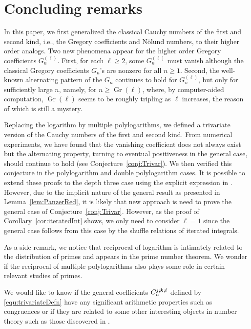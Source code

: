 \documentclass[11pt]{article}
\newcommand{\bfk}{{\boldsymbol{\sl{k}}}}
\DeclareMathOperator{\Gr}{Gr}
\theoremstyle{plain}
\theoremstyle{definition}
\begin{document}
\section{Concluding remarks}
In this paper, we first generalized the classical Cauchy numbers of the first and second kind, i.e., the Gregory coefficients and N\"olund numbers, to their higher order analogs. Two new phenomena appear for the higher order Gregory coefficients $G_n^{(\ell)}$. First, for each $\ell\ge 2$, some $G_n^{(\ell)}$ must vanish although the classical Gregory coefficients $G_n$'s are nonzero for all $n\ge1$. Second, the well-known alternating pattern of the $G_n$ continues to hold for $G_n^{(\ell)}$, but only for sufficiently large $n$, namely, for $n\ge \Gr(\ell)$, where, by computer-aided computation, $\Gr(\ell)$ seems to be roughly tripling as $\ell$ increases, the reason of which is still a mystery.

Replacing the logarithm by multiple polylogarithms, we defined a trivariate version of the Cauchy numbers of the first and second kind. From numerical experiments, we have found that the vanishing coefficient does not always exist but the alternating property, turning to eventual positiveness in the general case, should continue to hold (see Conjecture~\ref{conj:Trivar}). We then verified this conjecture in the polylogarithm and double polylogarithm cases. It is possible to extend these proofs to the depth three case using the explicit expression in \cite[(4.3)]{Panzer2017}. However, due to the implicit nature of the general result as presented in Lemma~\ref{lem:PanzerRed}, it is likely that new approach is need  to prove the general case of Conjecture~\ref{conj:Trivar}. However, as the proof of Corollary~\ref{cor:iteratedInt} shows, we only need to consider $\ell=1$ since the general case follows from this case by the shuffle relations of iterated integrals.

As a side remark, we notice that reciprocal of logarithm is intimately related to the distribution of primes and appears in the prime number theorem. We wonder if the reciprocal of multiple polylogarithms also plays some role in certain relevant studies of primes.

We would like to know if the general coefficients $C_{n}^{j;\bfk;\ell}$ defined by \eqref{equ:trivariateDefn} have any significant arithmetic properties such as congruences or if they are related to some other interesting objects in number theory such as those discovered in \cite{KanekoMatsusakaSeki2025}.
\end{document}
